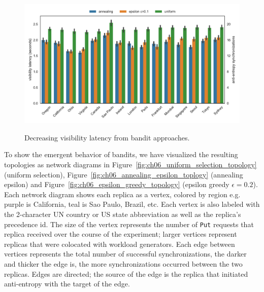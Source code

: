 \begin{figure}
    \begin{center}
        \includegraphics[width=5in]{figures/ch06_visibility_latency.pdf}
    \end{center}
    \renewcommand{\baselinestretch}{1}
    \small\normalsize

    \begin{quote}
        \caption[Visibility Latency]{Decreasing visibility latency from bandit approaches.}
        \label{fig:ch06_visibility_latency}
    \end{quote}
\end{figure}
\renewcommand{\baselinestretch}{2}
\small\normalsize

To show the emergent behavior of bandits, we have visualized the resulting
topologies as network diagrams in Figure~\ref{fig:ch06_uniform_selection_topology} (uniform
selection), Figure~\ref{fig:ch06_annealing_epsilon_toplogy} (annealing epsilon) and
Figure~\ref{fig:ch06_epsilon_greedy_topology} (epsilon greedy $\epsilon=0.2$).
Each network diagram shows each replica as a vertex, colored by region e.g.
purple is California, teal is Sao Paulo, Brazil, etc.
Each vertex is also labeled with the 2-character UN country or US state
abbreviation as well as the replica's precedence id.
The size of the vertex represents the number of \texttt{Put} requests that
replica received over the course of the experiment; larger vertices
represent replicas that were colocated with workload generators.
Each edge between vertices represents the total number of successful
synchronizations, the darker and thicker the edge is, the more
synchronizations occurred between the two replicas.
Edges are directed; the source of the edge is the replica that initiated
anti-entropy with the target of the edge.

